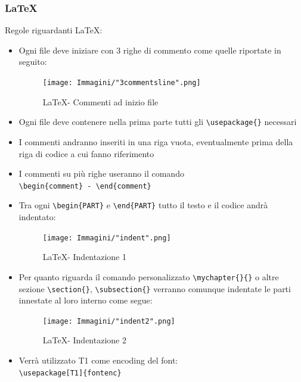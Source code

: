 \documentclass[a4paper]{report}
\newcommand{\mychapter}[2]{
	\setcounter{chapter}{#1}
	\setcounter{section}{0}
	\setcounter{subsection}{1}
	\chapter*{#2}
	\addcontentsline{toc}{chapter}{#2}
}
\begin{document}
	\subsubsection{\LaTeX}
	Regole riguardanti \LaTeX :
	\begin{itemize}
		\item Ogni file deve iniziare con 3 righe di commento come quelle riportate in seguito:
		\begin{figure}[H]
			\centering
			\texttt{[image: Immagini/"3commentsline".png]}
			\caption{\LaTeX \space - Commenti ad inizio file}
		\end{figure}
		\item Ogni file deve contenere nella prima parte tutti gli \verb|\usepackage{}| necessari
		\item I commenti andranno inseriti in una riga vuota, eventualmente prima della riga di 
		codice a cui fanno riferimento
		\item I commenti su più righe useranno il comando \\ \verb|\begin{comment} - \end{comment}|
		\item Tra ogni \verb|\begin{PART}| e \verb|\end{PART}| tutto il testo e il codice andrà indentato:
		\begin{figure}[H]
			\centering
			\texttt{[image: Immagini/"indent".png]}
			\caption{\LaTeX \space - Indentazione 1}
		\end{figure}
		\item Per quanto riguarda il comando personalizzato \verb|\mychapter{}{}| o altre sezione \verb|\section{}|, \verb|\subsection{}| 
		verranno comunque indentate le parti innestate al loro interno come segue:
		\begin{figure}[H]
			\centering
			\texttt{[image: Immagini/"indent2".png]}
			\caption{\LaTeX \space - Indentazione 2}
		\end{figure}
		\item Verrà utilizzato T1 come encoding del font: \\ \verb|\usepackage[T1]{fontenc}|

\end{itemize}
\end{document}
